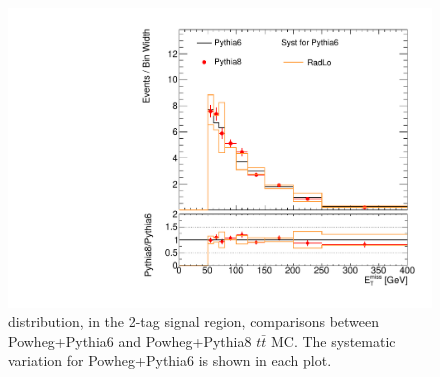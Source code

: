 \begin{figure}[!h]
\begin{center}
\includegraphics[scale=0.33]{./figures/boosted/TTBarPy6VsPy8/TTBarPy6VsPy8_SR_MET_radlo}
\caption{\met distribution, in the 2-tag signal region, comparisons between Powheg+Pythia6 and Powheg+Pythia8 $t\bar{t}$ MC. 
The systematic variation for Powheg+Pythia6 is shown in each plot.}
\label{fig:boosted_ttbarpy6py8_MET}
\end{center}
\end{figure}

